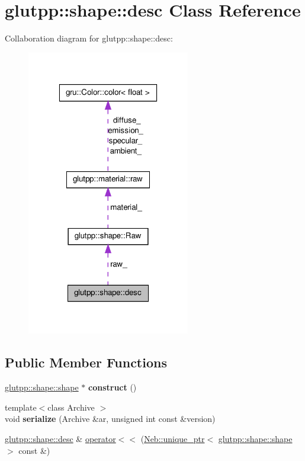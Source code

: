 \hypertarget{classglutpp_1_1shape_1_1desc}{\section{glutpp\-:\-:shape\-:\-:desc \-Class \-Reference}
\label{classglutpp_1_1shape_1_1desc}
}


\-Collaboration diagram for glutpp\-:\-:shape\-:\-:desc\-:\nopagebreak
\begin{figure}[H]
\begin{center}
\leavevmode
\includegraphics[width=202pt]{classglutpp_1_1shape_1_1desc__coll__graph}
\end{center}
\end{figure}
\subsection*{\-Public \-Member \-Functions}
\begin{DoxyCompactItemize}
\item 
\hypertarget{classglutpp_1_1shape_1_1desc_af36dd71962f6a94dded41e5f2edf88f3}{\hyperlink{classglutpp_1_1shape_1_1shape}{glutpp\-::shape\-::shape} $\ast$ {\bfseries construct} ()}\label{classglutpp_1_1shape_1_1desc_af36dd71962f6a94dded41e5f2edf88f3}

\item 
\hypertarget{classglutpp_1_1shape_1_1desc_a1f9c214768dcae2d45b70d1e930a8381}{{\footnotesize template$<$class Archive $>$ }\\void {\bfseries serialize} (\-Archive \&ar, unsigned int const \&version)}\label{classglutpp_1_1shape_1_1desc_a1f9c214768dcae2d45b70d1e930a8381}

\item 
\hyperlink{classglutpp_1_1shape_1_1desc}{glutpp\-::shape\-::desc} \& \hyperlink{classglutpp_1_1shape_1_1desc_ac128de74ae06c2d4064e87bf638aa5e6}{operator$<$$<$} (\hyperlink{classNeb_1_1unique__ptr}{\-Neb\-::unique\-\_\-ptr}$<$ \hyperlink{classglutpp_1_1shape_1_1shape}{glutpp\-::shape\-::shape} $>$ const \&)
\end{DoxyCompactItemize}
